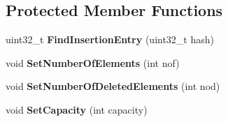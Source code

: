 \subsection*{Protected Member Functions}
\begin{DoxyCompactItemize}
\item 
\hypertarget{classv8_1_1internal_1_1_hash_table_ab5c5f8f269e12f80b7a9f4b3aed66d9d}{}uint32\+\_\+t {\bfseries Find\+Insertion\+Entry} (uint32\+\_\+t hash)\label{classv8_1_1internal_1_1_hash_table_ab5c5f8f269e12f80b7a9f4b3aed66d9d}

\item 
\hypertarget{classv8_1_1internal_1_1_hash_table_a00af303ae5587d2420ad73e07d9c29a0}{}void {\bfseries Set\+Number\+Of\+Elements} (int nof)\label{classv8_1_1internal_1_1_hash_table_a00af303ae5587d2420ad73e07d9c29a0}

\item 
\hypertarget{classv8_1_1internal_1_1_hash_table_a6e3f383bc186686fe8b02dab1eb24800}{}void {\bfseries Set\+Number\+Of\+Deleted\+Elements} (int nod)\label{classv8_1_1internal_1_1_hash_table_a6e3f383bc186686fe8b02dab1eb24800}

\item 
\hypertarget{classv8_1_1internal_1_1_hash_table_ae6e89723132098336b460a8f55bc6052}{}void {\bfseries Set\+Capacity} (int capacity)\label{classv8_1_1internal_1_1_hash_table_ae6e89723132098336b460a8f55bc6052}

\end{DoxyCompactItemize}
